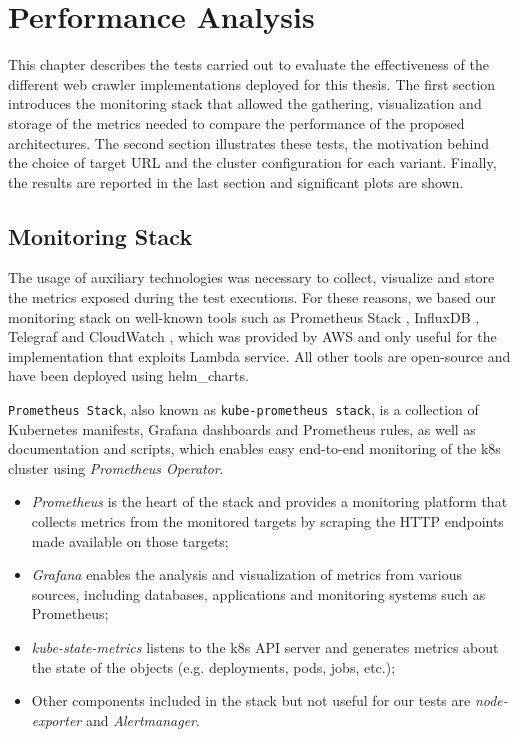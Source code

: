 \documentclass[../thesis.tex]{subfiles}
\begin{document}
\chapter{Performance Analysis}\label{cap:performance_analysis}

This chapter describes the tests carried out to evaluate the effectiveness of the different web crawler implementations deployed for this thesis. The first section introduces the monitoring stack that allowed the gathering, visualization and storage of the metrics needed to compare the performance of the proposed architectures. The second section illustrates these tests, the motivation behind the choice of target \acrshort{URL} and the cluster configuration for each variant. Finally, the results are reported in the last section and significant plots are shown.

\section{Monitoring Stack}
The usage of auxiliary technologies was necessary to collect, visualize and store the metrics exposed during the test executions. For these reasons, we based our monitoring stack on well-known tools such as Prometheus Stack \cite{site:kube_prom_stack}, InfluxDB \cite{site:influxdb}, Telegraf \cite{site:telegraf} and CloudWatch \cite{site:cloudwatch_doc}, which was provided by \acrshort{AWS} and only useful for the implementation that exploits Lambda service. All other tools are open-source and have been deployed using \gls{helm_chart}s.

\texttt{Prometheus Stack}, also known as \texttt{kube-prometheus stack}, is a collection of Kubernetes manifests, Grafana dashboards and Prometheus rules, as well as documentation and scripts, which enables easy end-to-end monitoring of the \gls{k8s} cluster using \textit{Prometheus Operator}.

\begin{itemize}
    \item \textit{Prometheus} is the heart of the stack and provides a monitoring platform that collects metrics from the monitored targets by scraping the \acrshort{HTTP} endpoints made available on those targets;
    \item \textit{Grafana} enables the analysis and visualization of metrics from various sources, including databases, applications and monitoring systems such as Prometheus;
    \item \textit{kube-state-metrics} listens to the \gls{k8s} \acrshort{API} server and generates metrics about the state of the objects (e.g. \gls{deployment}s, \gls{pod}s, \gls{job}s, etc.);
    \item Other components included in the stack but not useful for our tests are \textit{node-exporter} and \textit{Alertmanager}.
\end{itemize}
\end{document}
